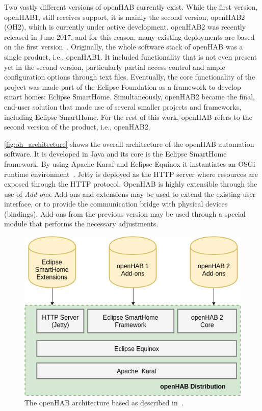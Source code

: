 \documentclass[12pt]{article}
\begin{document}
Two vastly different versions of openHAB currently exist. While the first version, openHAB1, still receives support, it is mainly the second version, openHAB2 (OH2), which is currently under active development. openHAB2 was recently released in June 2017, and for this reason, many existing deployments are based on the first version~\cite{openhab_01}. Originally, the whole software stack of openHAB was a single product, i.e., openHAB1. It included functionality that is not even present yet in the second version, particularly partial access control and ample configuration options through text files. Eventually, the core functionality of the project was made part of the Eclipse Foundation as a framework to develop smart homes: Eclipse SmartHome. Simultaneously, openHAB2 became the final, end-user solution that made use of several smaller projects and frameworks, including Eclipse SmartHome. For the rest of this work, openHAB refers to the second version of the product, i.e., openHAB2.

\autoref{fig:oh_architecture} shows the overall architecture of the openHAB automation software. It is developed in Java and its core is the Eclipse SmartHome framework. By using Apache Karaf and Eclipse Equinox it instantiates an OSGi runtime environment~\cite{openhab_02}. Jetty is deployed as the HTTP server where resources are exposed through the HTTP protocol. OpenHAB is highly extensible through the use of \emph{Add-ons}. Add-ons and extensions may be used to extend the existing user interface, or to provide the communication bridge with physical devices (bindings). Add-ons from the previous version may be used through a special module that performs the necessary adjustments. 

\begin{figure} [ht] 
\begin{center}
\includegraphics[width=\textwidth]{oh_architecture}
\caption{The openHAB architecture based as described in~\cite{openhab_02}.}
\label{fig:oh_architecture}
\end{center}
\end{figure}
\end{document}
